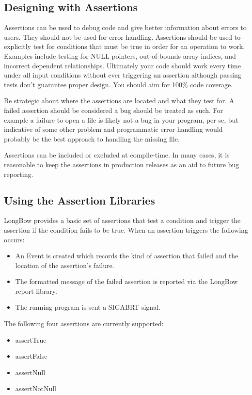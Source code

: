 \documentclass[12pt]{article} %
\begin{document}
\subsection{Designing with Assertions }
Assertions can be used to debug code and give better information about errors to users. They should not be used for error handling.  Assertions should be used to explicitly test for conditions that must be true in order for an operation to work. Examples include testing for NULL pointers, out-of-bounds array indices, and incorrect dependent relationships. Ultimately your code should work every time under all input conditions without ever triggering an assertion although passing tests don't guarantee proper design. You should aim for 100\% code coverage.

Be strategic about where the assertions are located and what they test for.
A failed assertion should be considered a bug should be treated as such. For example a failure to open a file is likely not a bug in your program, per se, but indicative of some other problem and programmatic error handling would probably be the best approach to handling the missing file.

Assertions can be included or excluded at compile-time. In many cases, it is reasonable to keep the assertions in production releases as an aid to future bug reporting.
  
\subsection{Using the Assertion Libraries }  

LongBow provides a basic set of assertions that test a condition and trigger the assertion if the condition fails to be true. When an assertion triggers the following occurs:
\begin{itemize}
\item An Event is created which records the kind of assertion that failed and the location of the assertion's failure.
\item The formatted message of the failed assertion is reported via the LongBow report library.
\item The running program is sent a SIGABRT signal.
\end{itemize}

The following four assertions are currently supported:
\begin{itemize}
\item  assertTrue
\item  assertFalse 
\item  assertNull 
\item  assertNotNull
\end{itemize}
\end{document}
